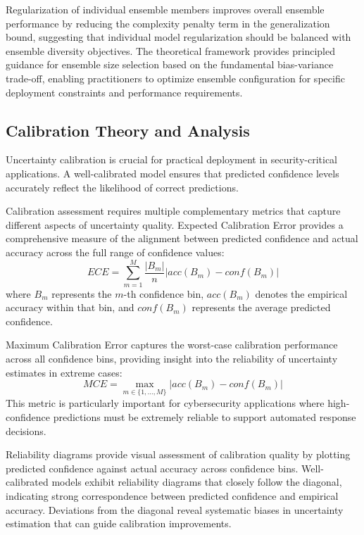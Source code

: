\documentclass[journal]{IEEEtran}
\begin{document}
Regularization of individual ensemble members improves overall ensemble performance by reducing the complexity penalty term in the generalization bound, suggesting that individual model regularization should be balanced with ensemble diversity objectives. The theoretical framework provides principled guidance for ensemble size selection based on the fundamental bias-variance trade-off, enabling practitioners to optimize ensemble configuration for specific deployment constraints and performance requirements.

\subsection{Calibration Theory and Analysis}

Uncertainty calibration is crucial for practical deployment in security-critical applications. A well-calibrated model ensures that predicted confidence levels accurately reflect the likelihood of correct predictions.

Calibration assessment requires multiple complementary metrics that capture different aspects of uncertainty quality. Expected Calibration Error provides a comprehensive measure of the alignment between predicted confidence and actual accuracy across the full range of confidence values:
\begin{equation}
ECE = \sum_{m=1}^M \frac{|B_m|}{n} |acc(B_m) - conf(B_m)|
\end{equation}
where $B_m$ represents the $m$-th confidence bin, $acc(B_m)$ denotes the empirical accuracy within that bin, and $conf(B_m)$ represents the average predicted confidence.

Maximum Calibration Error captures the worst-case calibration performance across all confidence bins, providing insight into the reliability of uncertainty estimates in extreme cases:
\begin{equation}
MCE = \max_{m \in \{1,...,M\}} |acc(B_m) - conf(B_m)|
\end{equation}
This metric is particularly important for cybersecurity applications where high-confidence predictions must be extremely reliable to support automated response decisions.

Reliability diagrams provide visual assessment of calibration quality by plotting predicted confidence against actual accuracy across confidence bins. Well-calibrated models exhibit reliability diagrams that closely follow the diagonal, indicating strong correspondence between predicted confidence and empirical accuracy. Deviations from the diagonal reveal systematic biases in uncertainty estimation that can guide calibration improvements.
\end{document}

